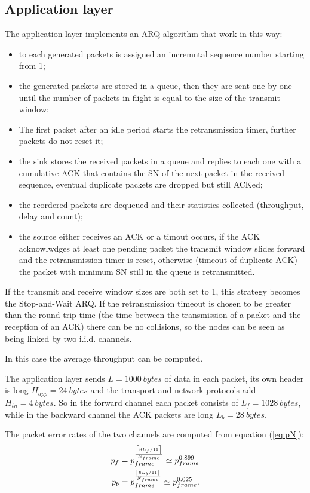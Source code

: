 \subsection{Application layer}
The application layer implements an ARQ algorithm that work in this
way:
\begin{itemize}
\item to each generated packets is assigned an incremntal sequence
  number starting from 1;
\item the generated packets are stored in a queue, then they are sent
  one by one until the number of packets in flight is equal to the
  size of the transmit window;
\item The first packet after an idle period starts the retransmission
  timer, further packets do not reset it;
\item the sink stores the received packets in a queue and replies to
  each one with a cumulative ACK that contains the SN of the next
  packet in the received sequence, eventual duplicate packets are
  dropped but still ACKed;
\item the reordered packets are dequeued and their statistics
  collected (throughput, delay and count);
\item the source either receives an ACK or a timout occurs, if the ACK
  acknowlwdges at least one pending packet the transmit window slides
  forward and the retransmission timer is reset, otherwise (timeout of
  duplicate ACK) the packet with minimum SN still in the queue is
  retransmitted.
\end{itemize}

If the transmit and receive window sizes are both set to 1, this
strategy becomes the Stop-and-Wait ARQ. If the retransmission timeout
is chosen to be greater than the round trip time (the time between the
transmission of a packet and the reception of an ACK) there can be no
collisions, so the nodes can be seen as being linked by two
i.i.d. channels.

In this case the average throughput can be computed.

The application layer sends $L=\SI{1000}{bytes}$ of data in each
packet, its own header is long $H_{app} = \SI{24}{bytes}$ and the
transport and network protocols add $H_{tn} = \SI{4}{bytes}$. So in
the forward channel each packet consists of $L_f = \SI{1028}{bytes}$,
while in the backward channel the ACK packets are long $L_b
= \SI{28}{bytes}$.

The packet error rates of the two channels are computed
from equation (\ref{eq:pN}):
\begin{align}
  p_f &= p_{frame}^\frac{\left\lceil8 L_f / 11\right\rceil}{N_{frame}} \simeq p_{frame}^{0.899} \\
  p_b &= p_{frame}^\frac{\left\lceil8 L_b / 11\right\rceil}{N_{frame}} \simeq p_{frame}^{0.025} .
\end{align}

